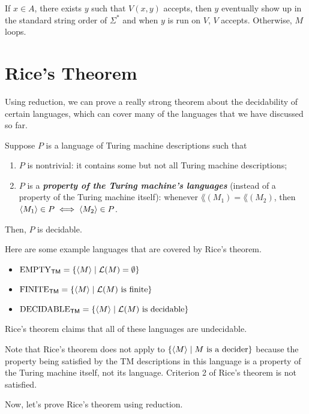 If $x \in A$, there exists $y$ such that $V(x,y)$ accepts, then $y$ eventually show up in the standard string order of $\Sigma^*$ and when $y$ is run on $V$, $V$ accepts. Otherwise, $M$ loops.

\section{Rice's Theorem}

Using reduction, we can prove a really strong theorem about the decidability of certain languages, which can cover many of the languages that we have discussed so far.

\begin{theorem}
    Suppose $P$ is a language of Turing machine descriptions such that
    \begin{enumerate}
        \item $P$ is nontrivial: it contains some but not all Turing machine descriptions;
        \item $P$ is a \textit{\textbf{property of the Turing machine's languages}} (instead of a property of the Turing machine itself): whenever $\lang(M_1) = \lang(M_2)$, then $\langle M_1 \rangle \in P \iff \langle M_2 \rangle \in P$.  
    \end{enumerate}
    Then, $P$ is decidable.
\end{theorem}

Here are some example languages that are covered by Rice's theorem.
\begin{example}
    \hfill
    \begin{itemize}
        \item $\mathrm{EMPTY}_{\mathsf{TM}} = \{ \langle M \rangle \mid \mathcal{L}(M) = \emptyset \}$
        \item $\mathrm{FINITE}_{\mathsf{TM}} = \{ \langle M \rangle \mid \text{$\mathcal{L}(M)$ is finite} \}$
        \item $\mathrm{DECIDABLE}_{\mathsf{TM}} = \{ \langle M \rangle \mid \text{$\mathcal{L}(M)$ is decidable} \}$
    \end{itemize}
    Rice's theorem claims that all of these languages are undecidable.

    Note that Rice's theorem does not apply to $\{ \langle M \rangle \mid \text{$M$ is a decider} \}$ because the property being satisfied by the TM descriptions in this language is a property of the Turing machine itself, not its language. Criterion 2 of Rice's theorem is not satisfied.
\end{example}

Now, let's prove Rice's theorem using reduction.

